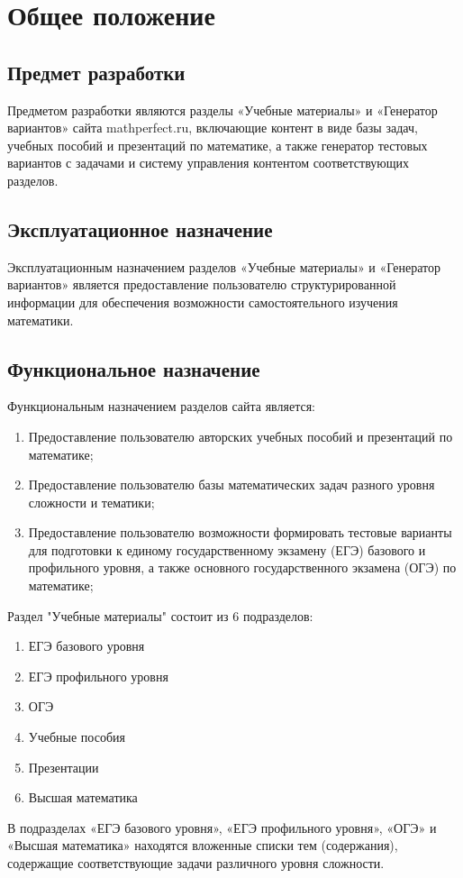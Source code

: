 \section{Общее положение}
\subsection{Предмет разработки}
Предметом разработки являются разделы «Учебные материалы» и «Генератор вариантов» сайта mathperfect.ru, включающие контент в виде базы задач, учебных пособий и презентаций по математике, а также генератор тестовых вариантов с задачами и систему управления контентом соответствующих разделов.

\subsection{Эксплуатационное назначение}
Эксплуатационным назначением разделов «Учебные материалы» и «Генератор вариантов» является предоставление пользователю структурированной информации для обеспечения возможности самостоятельного изучения математики.

\subsection{Функциональное назначение}
Функциональным назначением разделов сайта является:
\begin{enumerate}
  \item Предоставление пользователю авторских учебных пособий и презентаций по математике;
  \item Предоставление пользователю базы математических задач разного уровня сложности и тематики;
  \item Предоставление пользователю возможности формировать тестовые варианты для подготовки к единому государственному экзамену (ЕГЭ) базового и профильного уровня, а также основного государственного экзамена (ОГЭ) по математике;
\end{enumerate}

Раздел "Учебные материалы" состоит из 6 подразделов:
\begin{enumerate}
  \item ЕГЭ базового уровня
  \item ЕГЭ профильного уровня
  \item ОГЭ
  \item Учебные пособия
  \item Презентации
  \item Высшая математика
\end{enumerate}
В подразделах «ЕГЭ базового уровня», «ЕГЭ профильного уровня», «ОГЭ» и «Высшая математика» находятся вложенные списки тем (содержания), содержащие соответствующие задачи различного уровня сложности.

